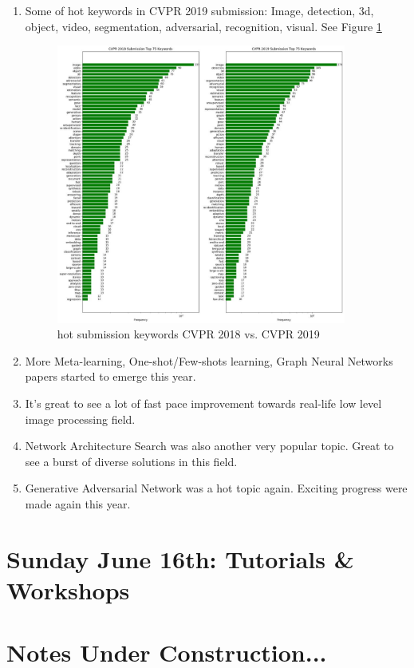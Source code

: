 \documentclass[11pt]{article}
\begin{document}
\begin{enumerate}
    \newpage
    \item Some of hot keywords in CVPR 2019 submission: Image, detection, 3d, object, video, segmentation, adversarial, recognition, visual. See Figure \ref{fig:Conf_HL3}
    \begin{figure}[ht!]
        \centering
        \includegraphics[width=0.9\textwidth]{images/Image3.jpeg}
        \caption{hot submission keywords CVPR 2018 vs. CVPR 2019}
        \label{fig:Conf_HL3}
    \end{figure}
    
    \item More Meta-learning, One-shot/Few-shots learning, Graph Neural Networks papers started to emerge this year.
    \item It's great to see a lot of fast pace improvement towards real-life low level image processing field.
    \item Network Architecture Search was also another very popular topic. Great to see a burst of diverse solutions in this field.
    \item Generative Adversarial Network was a hot topic again. Exciting progress were made again this year.
\end{enumerate}{}

\newpage
\section{Sunday June 16th: Tutorials \& Workshops}


\newpage
\section{Notes Under Construction...}

\end{document}
